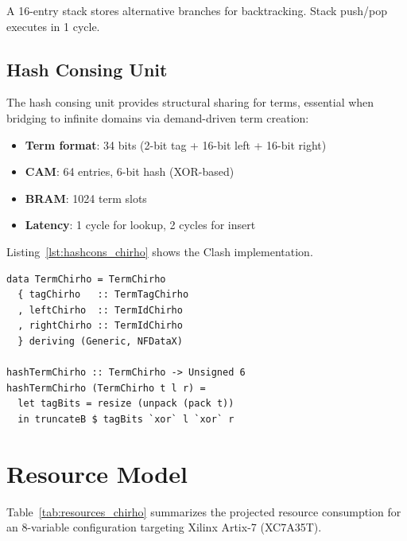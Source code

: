 \documentclass[11pt,a4paper]{article}
\begin{document}
A 16-entry stack stores alternative branches for backtracking. Stack push/pop
executes in 1 cycle.

\subsection{Hash Consing Unit}
\label{subsec:hashcons_unit_chirho}

The hash consing unit provides structural sharing for terms, essential when
bridging to infinite domains via demand-driven term creation:

\begin{itemize}
  \item \textbf{Term format}: 34 bits (2-bit tag + 16-bit left + 16-bit right)
  \item \textbf{CAM}: 64 entries, 6-bit hash (XOR-based)
  \item \textbf{BRAM}: 1024 term slots
  \item \textbf{Latency}: 1 cycle for lookup, 2 cycles for insert
\end{itemize}

Listing~\ref{lst:hashcons_chirho} shows the Clash implementation.

\begin{lstlisting}[style=calyxstyle_chirho, caption={Hash consing types in Clash (excerpt from \texttt{clash\_chirho/HashConsChirho.hs})}, label={lst:hashcons_chirho}]
data TermChirho = TermChirho
  { tagChirho   :: TermTagChirho
  , leftChirho  :: TermIdChirho
  , rightChirho :: TermIdChirho
  } deriving (Generic, NFDataX)

hashTermChirho :: TermChirho -> Unsigned 6
hashTermChirho (TermChirho t l r) =
  let tagBits = resize (unpack (pack t))
  in truncateB $ tagBits `xor` l `xor` r
\end{lstlisting}

\section{Resource Model}
\label{sec:resource_chirho}

Table~\ref{tab:resources_chirho} summarizes the projected resource consumption
for an 8-variable configuration targeting Xilinx Artix-7 (XC7A35T).
\end{document}
